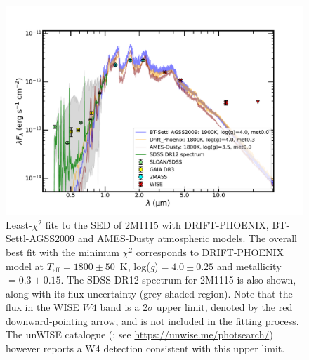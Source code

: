 \documentclass{aa}
\newcommand{\Teff}{\ensuremath{T_{\mathrm{eff}}}\xspace}
\begin{document}
\begin{appendix}
\begin{figure}
    \centering
    \includegraphics[width=1.0\linewidth, trim = {0.9cm 0.4cm 2cm 0.5cm}, clip]{SED_fit_new.pdf}
    \caption{Least-$\chi^2$ fits to the SED of 2M1115 with DRIFT-PHOENIX, BT-Settl-AGSS2009 and AMES-Dusty atmospheric models. The overall best fit with the minimum $\chi^2$
    corresponds to DRIFT-PHOENIX model at $\Teff=1800\pm50$~K, log(\textsl{g})$=4.0\pm0.25$ and metallicity$=0.3\pm0.15$. The SDSS DR12 spectrum for 2M1115 is also shown, along with its flux uncertainty (grey shaded region). Note that the flux in the WISE $W4$ band is a 2$\sigma$ upper limit, denoted by the red downward-pointing arrow, and is not included in the fitting process. The unWISE catalogue (\citealp{lang16}; see \url{https://unwise.me/photsearch/}) however reports a W4 detection consistent with this upper limit.}
    \label{apfig5}
\end{figure}



\end{appendix}
\end{document}

